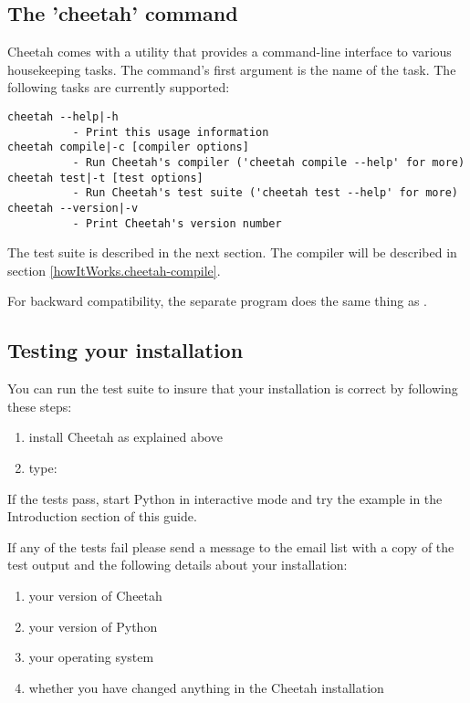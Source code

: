 \subsection{The 'cheetah' command}
\label{gettingStarted.cheetah}

Cheetah comes with a utility  that provides a command-line
interface to various housekeeping tasks.  The command's first argument is
the name of the task.  The following tasks are currently supported:

\begin{verbatim}
cheetah --help|-h            
          - Print this usage information
cheetah compile|-c [compiler options]
          - Run Cheetah's compiler ('cheetah compile --help' for more)
cheetah test|-t [test options]
          - Run Cheetah's test suite ('cheetah test --help' for more)
cheetah --version|-v
          - Print Cheetah's version number
\end{verbatim}

The test suite is described in the next section.  The compiler will be
described in section \ref{howItWorks.cheetah-compile}.

For backward compatibility, the separate  program
does the same thing as .

\subsection{Testing your installation}
\label{gettingStarted.test}

You can run the test suite to insure that your installation is correct by
following these steps:
\begin{enumerate}
\item install Cheetah as explained above
\item type:  
\end{enumerate}

If the tests pass, start Python in interactive mode and try the example in the
Introduction section of this guide.

If any of the tests fail please send a message to the email list with a copy of
the test output and the following details about your installation:

\begin{enumerate}
\item your version of Cheetah
\item your version of Python
\item your operating system
\item whether you have changed anything in the Cheetah installation
\end{enumerate}

